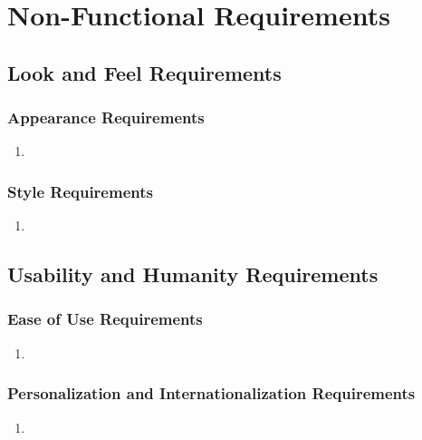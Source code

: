 \documentclass[]{article}
\begin{document}

\section{Non-Functional Requirements}
\label{sec:non-functional_requirements}
\subsection{Look and Feel Requirements}
\label{sub:look_and_feel_requirements}

\subsubsection{Appearance Requirements}
\label{ssub:appearance_requirements}
\begin{enumerate}[{LF}1. ]
	\item 
\end{enumerate}

\subsubsection{Style Requirements}
\label{ssub:style_requirements}
\begin{enumerate}[{LF}1. ]
	\item 
\end{enumerate}


\subsection{Usability and Humanity Requirements}
\label{sub:usability_and_humanity_requirements}

\subsubsection{Ease of Use Requirements}
\label{ssub:ease_of_use_requirements}
\begin{enumerate}[{UH}1. ]
	\item 
\end{enumerate}

\subsubsection{Personalization and Internationalization Requirements}
\label{ssub:personalization_and_internationalization_requirements}
\begin{enumerate}[{UH}1. ]
	\item 
\end{enumerate}
\end{document}
